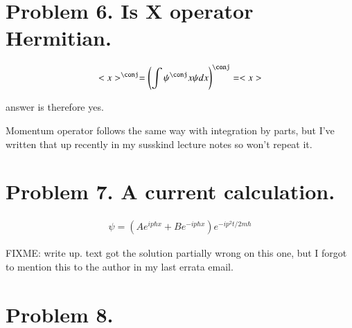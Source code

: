 \documentclass{article}
\begin{document}
\section{ Problem 6. Is X operator Hermitian. }

\begin{align*}
<x>^\conj = \left(\int \psi^\conj x \psi dx\right)^\conj = <x>
\end{align*}

answer is therefore yes.

Momentum operator follows the same way with integration by parts, but I've
written that up recently in my susskind lecture notes so won't repeat it.

\section{ Problem 7. A current calculation. }

\begin{align*}
\psi = (A e^{ip\hbar x} + B e^{-ip\hbar x})e^{-i p^2 t/2 m\hbar}
\end{align*}

FIXME: write up.  text got the solution partially wrong on this one, but I
forgot to mention this to the author in my last errata email.

\section{ Problem 8. }



\end{document}
